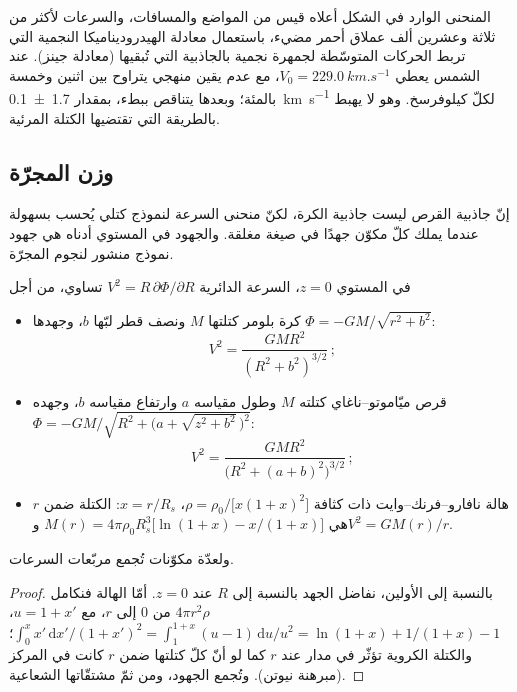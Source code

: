 المنحنى الوارد في الشكل أعلاه قيس من المواضع والمسافات،
والسرعات لأكثر من ثلاثة وعشرين ألف عملاق أحمر مضيء،
باستعمال معادلة الهيدروديناميكا النجمية التي تربط الحركات المتوسّطة
لجمهرة نجمية بالجاذبية التي تُبقيها (معادلة جينز).
عند الشمس يعطي $V_0 = \qty{229.0}{km.s^{-1}}$، مع عدم يقين منهجي
يتراوح بين اثنين وخمسة بالمئة؛ وبعدها يتناقص ببطء، بمقدار
\qty[separate-uncertainty=true]{1.7 \pm 0.1}{km.s^{-1}} لكلّ كيلوفرسخ. وهو
لا يهبط بالطريقة التي تقتضيها الكتلة المرئية.

\subsection*{وزن المجرّة}

إنّ جاذبية القرص ليست جاذبية الكرة، لكنّ منحنى السرعة
لنموذج كتلي يُحسب بسهولة عندما يملك كلّ مكوّن جهدًا في
صيغة مغلقة. والجهود في المستوي أدناه هي جهود نموذج منشور
لنجوم المجرّة.

\begin{proposition}\label{prop:b3:milky-way-galaxies:models}
في المستوي $z = 0$، السرعة الدائرية $V^2 = R\,\partial\Phi/\partial R$
تساوي، من أجل
\begin{itemize}
\item كرة بلومر كتلتها $M$ ونصف قطر لبّها $b$، وجهدها
  $\Phi = -GM/\sqrt{r^2 + b^2}$:
  \[ V^2 = \frac{GMR^2}{(R^2 + b^2)^{3/2}}\,; \]
\item قرص ميّاموتو--ناغاي كتلته $M$ وطول مقياسه $a$ وارتفاع
  مقياسه $b$، وجهده
  $\Phi = -GM\big/\sqrt{R^2 + \bigl(a + \sqrt{z^2 + b^2}\,\bigr)^2}$:
  \[ V^2 = \frac{GMR^2}{\bigl(R^2 + (a + b)^2\bigr)^{3/2}}\,; \]
\item هالة نافارو--فرنك--وايت ذات كثافة
  $\rho = \rho_0\big/\bigl[x(1 + x)^2\bigr]$، $x = r/R_s$: الكتلة ضمن $r$
  هي $M(r) = 4\pi\rho_0R_s^3\bigl[\ln(1 + x) - x/(1 + x)\bigr]$
  و$V^2 = GM(r)/r$.
\end{itemize}
ولعدّة مكوّنات تُجمع مربّعات السرعات.
\end{proposition}

\begin{proof}
بالنسبة إلى الأولين، نفاضل الجهد بالنسبة إلى $R$ عند
$z = 0$. أمّا الهالة فنكامل $4\pi r^2\rho$ من 0 إلى $r$، مع
$u = 1 + x'$، $\int_0^x x'\,\mathrm{d}x'/(1 + x')^2 =
\int_1^{1+x}(u - 1)\,\mathrm{d}u/u^2 = \ln(1 + x) + 1/(1 + x) - 1$؛ والكتلة الكروية
تؤثّر في مدار عند $r$ كما لو أنّ كلّ كتلتها ضمن $r$ كانت
في المركز (مبرهنة نيوتن). وتُجمع الجهود، ومن ثمّ
مشتقّاتها الشعاعية.
\end{proof}

